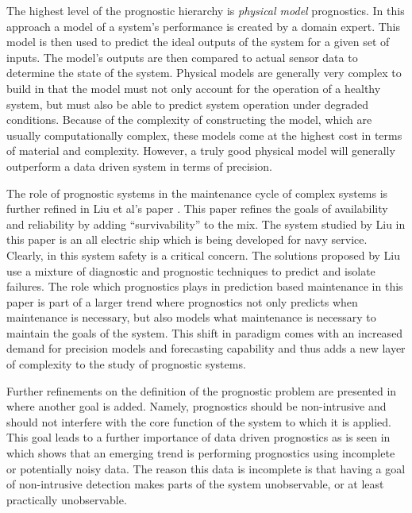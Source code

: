 \documentclass[12pt]{article}
\begin{document}
The highest level of the prognostic hierarchy is {\em physical model}
prognostics.  In this approach a model of a system's performance is created by
a domain expert.  This model is then used to predict the ideal outputs of the
system for a given set of inputs.  The model's outputs are then compared to
actual sensor data to determine the state of the system.  Physical models are
generally very complex to build in that the model must not only account for the
operation of a healthy system, but must also be able to predict system
operation under degraded conditions.  Because of the complexity of constructing
the model, which are usually computationally complex, these models come at the
highest cost in terms of material and complexity.  However, a truly good
physical model will generally outperform a data driven system in terms of
precision.  

The role of prognostic systems in the maintenance cycle of complex systems is
further refined in Liu et al's paper \cite{4273732}.  This paper refines the
goals of availability and reliability by adding ``survivability'' to the mix.
The system studied by Liu in this paper is an all electric ship which is being
developed for navy service.  Clearly, in this system safety is a critical
concern.  The solutions proposed by Liu use a mixture of diagnostic and
prognostic techniques to predict and isolate failures.  The role which
prognostics plays in prediction based maintenance in this paper is part of a
larger trend where prognostics not only predicts when maintenance is necessary,
but also models what maintenance is necessary to maintain the goals of the
system.  This shift in paradigm comes with an increased demand for precision
models and forecasting capability and thus adds a new layer of complexity to the
study of prognostic systems.  

Further refinements on the definition of the prognostic problem are presented in
\cite{4585821} where another goal is added.  Namely, prognostics should be
non-intrusive and should not interfere with the core function of the system to
which it is applied.  This goal leads to a further importance of data driven
prognostics as is seen in \cite{5393625} which shows that an emerging trend is
performing prognostics using incomplete or potentially noisy data.  The reason
this data is incomplete is that having a goal of non-intrusive detection makes
parts of the system unobservable, or at least practically unobservable.
\end{document}
